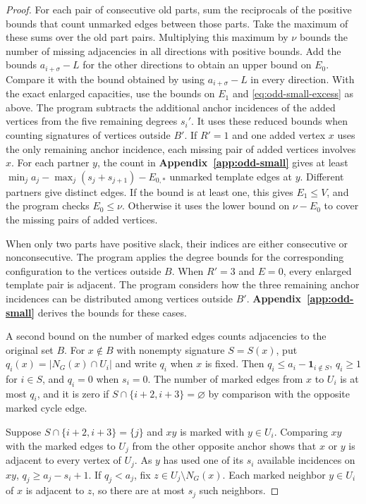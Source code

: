 \documentclass[preprint,11pt,numbers]{elsarticle-arxiv}
\numberwithin{equation}{section}
\theoremstyle{definition}
\begin{document}
\begin{proof}
For each pair of consecutive old parts, sum the reciprocals
of the positive bounds that count unmarked edges between
those parts. Take the maximum of these sums over the old
part pairs. Multiplying this maximum by $\nu$ bounds the
number of missing adjacencies in all directions with
positive bounds. Add the bounds $a_{i+\sigma}-L$ for the
other directions to obtain an upper bound on $E_0$. Compare
it with the bound obtained by using $a_{i+\sigma}-L$ in every
direction. With the exact enlarged capacities, use the bounds
on $E_1$ and \eqref{eq:odd-small-excess} as above.
The program subtracts the additional anchor incidences of the
added vertices from the five remaining degrees $s_i'$. It uses
these reduced bounds when counting signatures of vertices outside
$B'$. If $R'=1$ and one added vertex $x$ uses the only remaining
anchor incidence, each missing pair of added vertices involves
$x$. For each partner $y$, the count in
\textbf{Appendix~\ref{app:odd-small}} gives at least
$\min_j a_j-\max_j(s_j+s_{j+1})-E_{0,*}$ unmarked template edges
at $y$. Different partners give distinct edges. If the bound
is at least one, this gives $E_1\leq V$, and the program checks
$E_0\leq\nu$. Otherwise it uses the lower bound on $\nu-E_0$
to cover the missing pairs of added vertices.

When only two parts have positive slack, their indices are
either consecutive or nonconsecutive. The program applies the
degree bounds for the corresponding configuration to the vertices
outside $B$. When $R'=3$ and $E=0$, every enlarged template pair
is adjacent. The program considers how the three remaining anchor
incidences can be distributed among vertices outside $B'$.
\textbf{Appendix~\ref{app:odd-small}} derives the bounds for
these cases.

A second bound on the number of marked edges counts adjacencies
to the original set $B$. For $x\notin B$ with nonempty signature
$S=S(x)$, put $q_i(x)=|N_G(x)\cap U_i|$ and write $q_i$ when
$x$ is fixed. Then $q_i\leq a_i-\mathbf1_{i\notin S}$,
$q_i\geq1$ for $i\in S$, and $q_i=0$ when $s_i=0$. The number
of marked edges from $x$ to $U_i$ is at most $q_i$, and it is
zero if $S\cap\{i+2,i+3\}=\varnothing$ by comparison with
the opposite marked cycle edge.

Suppose $S\cap\{i+2,i+3\}=\{j\}$ and $xy$ is marked with
$y\in U_i$. Comparing $xy$ with the marked edges to $U_j$
from the other opposite anchor shows that $x$ or $y$ is
adjacent to every vertex of $U_j$. As $y$ has used one of
its $s_i$ available incidences on $xy$, $q_j\geq a_j-s_i+1$.
If $q_j<a_j$, fix $z\in U_j\setminus N_G(x)$. Each marked
neighbor $y\in U_i$ of $x$ is adjacent to $z$, so there
are at most $s_j$ such neighbors.


\end{proof}
\end{document}
